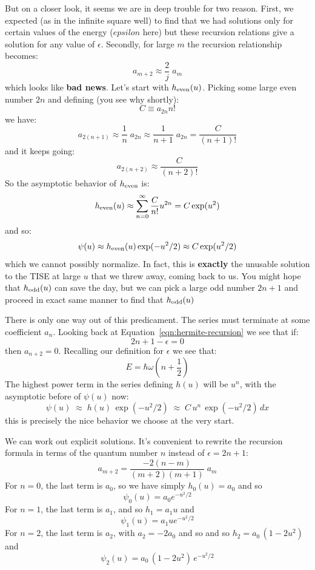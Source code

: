 \documentclass[12pt]{book}
\begin{document}
But on a closer look, it seems we are in deep trouble for two reason.  First, we expected (as in the infinite square well) to find that we had solutions only for certain values of the energy ($epsilon$ here) but these recursion relations give a solution for any value of $\epsilon$.  Secondly, for large $m$ the recursion relationship becomes:
$$a_{m+2} \approx \frac{2}{j}\;a_{m}$$
which looks like {\bf bad news}.  Let's start with $h_{\rm even}(u)$.  Picking some large even number $2n$ and defining (you see why shortly):
$$C \equiv a_{2n} n!$$
we have:
$$a_{2(n+1)} \approx \frac{1}{n}\;a_{2n} \approx \frac{1}{n+1}\;a_{2n} = \frac{C}{(n+1)!}$$
and it keeps going:
$$a_{2(n+2)} \approx \frac{C}{(n+2)!}$$
So the asymptotic behavior of $h_{\rm even}$ is:
$$h_{\rm even}(u) \approx \sum_{n=0}^{\infty} \frac{C}{n!}u^{2n} = C\exp(u^2)$$
and so:
$$\psi(u) \approx h_{\rm even}(u) \exp(-u^2/2) \approx C \exp(u^2/2)$$
which we cannot possibly normalize.  In fact, this is {\bf exactly} the unusable solution to the TISE at large $u$ that we threw away, coming back to us.
You might hope that $h_{\rm odd}(u)$ can save the day, but we can pick a large odd number $2n+1$ and proceed in exact same manner to find that $h_{\rm odd}(u)$

There is only one way out of this predicament.  The series must terminate at some coefficient $a_n$.
Looking back at Equation~\ref{eqn:hermite-recursion} we see that if:
$$2n+1-\epsilon = 0$$
then $a_{n+2} = 0$.  Recalling our definition for $\epsilon$ we see that:
\begin{equation}
E = \hbar \omega \left( n + \frac{1}{2} \right)
\end{equation}
The highest power term in the series defining $h(u)$ will be $u^n$, with the asymptotic before of $\psi(u)$ now:
$$\psi(u) \; \approx \; h(u) \, \exp(-u^2/2) \; \approx \; C \, u^n \, \exp(-u^2/2) \, dx $$
this is precisely the nice behavior we choose at the very start.

We can work out explicit solutions.  It's convenient to rewrite the recursion formula in terms of the quantum number $n$ instead of $\epsilon = 2n+1$:
\begin{equation}
a_{m+2} = \frac{-2(n-m)}{(m+2)(m+1)} \; a_m
\end{equation}
For $n=0$, the last term is $a_0$, so we have simply
$h_0(u) = a_0$ and so
$$\psi_0(u) = a_0 e^{-u^2/2}$$
For $n=1$, the last term is $a_1$, and so $h_1=a_1 u$ and
$$\psi_1(u) = a_1 u e^{-u^2/2} $$
For $n=2$, the last term is $a_2$, with $a_2 = -2a_0$ and so
and so $h_2=a_0 \, (1-2u^2)$ and
$$\psi_2(u) =  a_0 \, (1-2u^2) \, e^{-u^2/2} $$
\end{document}
